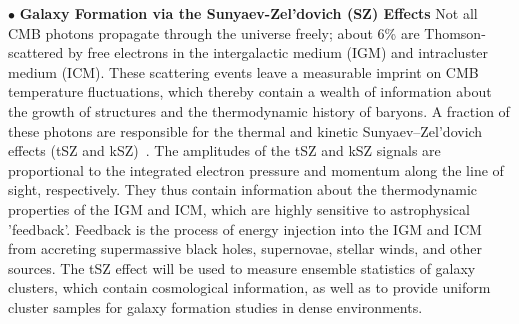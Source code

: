 \documentclass[PICOReport.tex]{subfiles}
\begin{document}
%
$\bullet$ {\bf Galaxy Formation via the Sunyaev-Zel'dovich (SZ) Effects} \hspace{0.1in} \label{sz}
Not all CMB photons propagate through the universe freely; about 6\% are Thomson-scattered by free electrons in the intergalactic medium (IGM) and intracluster medium (ICM). These scattering events leave a measurable imprint on CMB temperature fluctuations, which thereby contain a wealth of information about the growth of structures and the thermodynamic history of baryons. A fraction of these photons are responsible for the thermal and kinetic Sunyaev--Zel'dovich effects (tSZ and kSZ)~\citep{SZ1969,SZ1972}. 
The amplitudes of the tSZ and kSZ signals are proportional to the integrated electron pressure and momentum along the line of sight, respectively.  They thus contain information about the thermodynamic properties of the IGM and ICM, which are highly sensitive to astrophysical 'feedback'. Feedback is the process of energy injection into the IGM and ICM from accreting supermassive black holes, supernovae, stellar winds, and other sources.
The tSZ effect will be used to measure ensemble statistics of galaxy clusters, which contain cosmological information, as well as to provide uniform cluster samples for galaxy formation studies in dense environments. 
\end{document}

